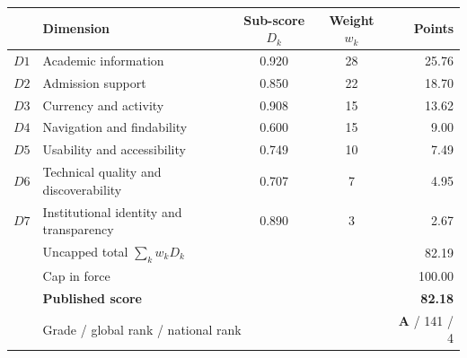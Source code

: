 \begin{tabular}{clccr}
\toprule
& \textbf{Dimension} & \textbf{Sub-score $D_k$} & \textbf{Weight $w_k$} & \textbf{Points} \\
\midrule
$D1$ & Academic information & 0.920 & 28 & 25.76 \\
$D2$ & Admission support & 0.850 & 22 & 18.70 \\
$D3$ & Currency and activity & 0.908 & 15 & 13.62 \\
$D4$ & Navigation and findability & 0.600 & 15 & 9.00 \\
$D5$ & Usability and accessibility & 0.749 & 10 & 7.49 \\
$D6$ & Technical quality and discoverability & 0.707 & 7 & 4.95 \\
$D7$ & Institutional identity and transparency & 0.890 & 3 & 2.67 \\
\midrule
& \multicolumn{3}{l}{Uncapped total $\sum_k w_k D_k$} & 82.19 \\
& \multicolumn{3}{l}{Cap in force} & 100.00 \\
& \multicolumn{3}{l}{\textbf{Published score}} & \textbf{82.18} \\
& \multicolumn{3}{l}{Grade / global rank / national rank} & \textbf{A} / 141 / 4 \\
\bottomrule
\end{tabular}

